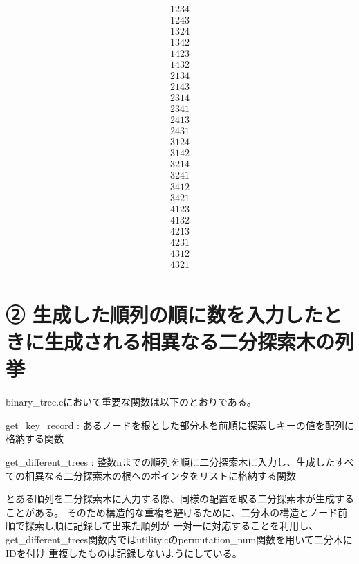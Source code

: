 \documentclass{ltjsarticle}
\begin{document}
\begin{align}
1 2 3 4\\
1 2 4 3\\
1 3 2 4\\
1 3 4 2\\
1 4 2 3\\
1 4 3 2\\
2 1 3 4\\
2 1 4 3\\
2 3 1 4\\
2 3 4 1\\
2 4 1 3\\
2 4 3 1\\
3 1 2 4\\
3 1 4 2\\
3 2 1 4\\
3 2 4 1\\
3 4 1 2\\
3 4 2 1\\
4 1 2 3\\
4 1 3 2\\
4 2 1 3\\
4 2 3 1\\
4 3 1 2\\
4 3 2 1\\
\end{align}

\section{➁ 生成した順列の順に数を入力したときに生成される相異なる二分探索木の列挙}



binary\_tree.cにおいて重要な関数は以下のとおりである。

\begin{list}{}{\leftmargin=1em}
\item get\_key\_record : あるノードを根とした部分木を前順に探索しキーの値を配列に格納する関数
\item get\_different\_trees : 整数nまでの順列を順に二分探索木に入力し、生成したすべての相異なる二分探索木の根へのポインタをリストに格納する関数
\end{list}

とある順列を二分探索木に入力する際、同様の配置を取る二分探索木が生成することがある。
そのため構造的な重複を避けるために、二分木の構造とノード前順で探索し順に記録して出来た順列が
一対一に対応することを利用し、get\_different\_trees関数内ではutility.cのpermutation\_num関数を用いて二分木にIDを付け
重複したものは記録しないようにしている。
\end{document}
